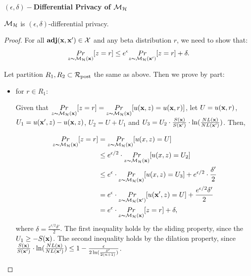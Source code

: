 \documentclass{article}
\begin{document}
\noindent \textbf{$(\epsilon, \delta)-$Differential Privacy of $\mathcal{M}_{\mathcal{H}}$}
\begin{lem}
\label{lem_hexpmech_privacy}
$\mathcal{M}_{\mathcal{H}}$ is $(\epsilon, \delta)$-differential privacy.
\end{lem}

\begin{proof}

For all $\textbf{adj}(\textbf{x},\textbf{x}') \in \mathcal{X}$ and any beta distribution $r$, we need to show that:
\begin{equation*}
\underset{z \thicksim \mathcal{M}_{\mathcal{H}}(\textbf{x})}{Pr}[ z = r] \leq e^{\epsilon} \underset{z \thicksim \mathcal{M}_{\mathcal{H}}(\textbf{x}')}{Pr}[z = r] + \delta. 
\end{equation*}

Let partition $R_1, R_2 \subset \mathcal{R}_{\textup{post}}$ the same as above. Then we prove by part:
\begin{itemize}
	\item for $r \in R_1$:

	Given that $\underset{z \thicksim \mathcal{M}_{\mathcal{H}}(\textbf{x})}{Pr}[z = r] = \underset{z \thicksim \mathcal{M}_{\mathcal{H}}(\textbf{x})}{Pr}[u(\textbf{x},z) = u(\textbf{x},r)]$, let $U = u(\textbf{x},r)$, $U_1 = u(\textbf{x}',z) - u(\textbf{x},z)$, $U_2 = U + U_1$ and $U_3 = U_2 \cdot \frac{S(\textbf{x})}{S(\textbf{x}')} \cdot \ln(\frac{NL(\textbf{x})}{NL(\textbf{x}')})$. Then,

	\begin{equation*}
	\begin{split}
	\underset{z \thicksim \mathcal{M}_{\mathcal{H}}(\textbf{x})}{Pr}[ z = r]
	& = \underset{z \thicksim \mathcal{M}_{\mathcal{H}}(\textbf{x})}{Pr}[ u(x,z) = U]\\
	& \leq e^{\epsilon / 2} \cdot \underset{z \thicksim \mathcal{M}_{\mathcal{H}}(\textbf{x})}{Pr}[ u(x,z) = U_2]\\
	& \leq e^{\epsilon} \cdot \underset{z \thicksim \mathcal{M}_{\mathcal{H}}(\textbf{x})}{Pr}[ u(x,z) = U_3] + e^{\epsilon/2} \cdot \frac{\delta'}{2}\\
	& = e^{\epsilon} \cdot \underset{z \thicksim \mathcal{M}_{\mathcal{H}}(\textbf{x}')}{Pr}[ u(\textbf{x}',z) = U] + \frac{e^{\epsilon/2} \delta'}{2} \\
	& = e^{\epsilon} \cdot \underset{z \thicksim \mathcal{M}_{\mathcal{H}}(\textbf{x})}{Pr}[ z = r] + \delta,
	\end{split}
	\end{equation*}
	where $\delta = \frac{e^{\epsilon/2} \delta'}{2}$.
	The first inequality holds by the sliding property, since the $U_1 \geq -S(\textbf{x})$. The second inequality holds by the dilation property, since $\frac{S(\textbf{x})}{S(\textbf{x}')} \cdot \ln(\frac{NL(\textbf{x})}{NL(\textbf{x}')}) \leq 1 - \frac{\epsilon}{2 \ln (\frac{\delta'}{2 (n + 1)})}$.


\end{itemize}
\end{proof}
\end{document}
